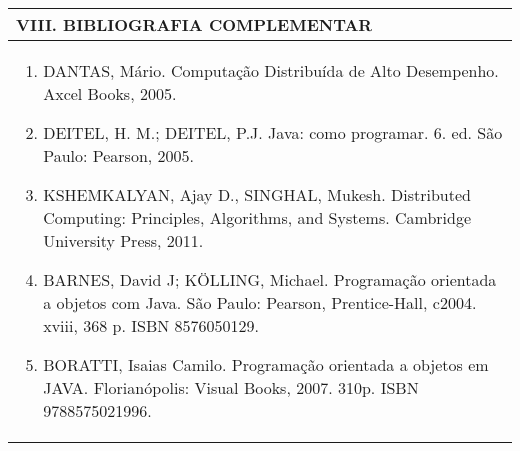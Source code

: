 \documentclass[12pt]{article}
\begin{document}
\begin{longtable}{|L{1.025\textwidth}|} \hline
%
{\bf VIII. BIBLIOGRAFIA COMPLEMENTAR} \\ \hline
\begin{enumerate}
\item DANTAS, Mário. Computação Distribuída de Alto Desempenho. Axcel Books, 2005. 
\item DEITEL, H. M.; DEITEL, P.J. Java: como programar. 6. ed. São Paulo: Pearson, 2005. 
\item KSHEMKALYAN, Ajay D., SINGHAL, Mukesh. Distributed Computing: Principles, Algorithms, and Systems. Cambridge University Press, 2011.
\item BARNES, David J; KÖLLING, Michael. Programação orientada a objetos com Java. São Paulo: Pearson, Prentice-Hall, c2004. xviii, 368 p. ISBN 8576050129.
\item BORATTI, Isaias Camilo. Programação orientada a objetos em JAVA. Florianópolis: Visual Books, 2007. 310p. ISBN 9788575021996.
%
\end{enumerate}
 \\ \hline
\end{longtable}



\end{document}

